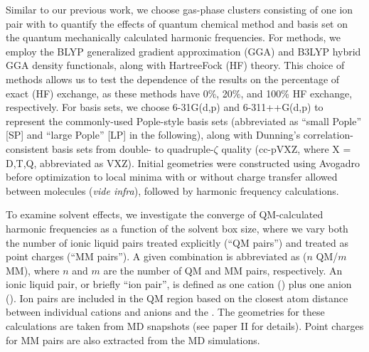 \documentclass[%
  class = book,%
  crop = false,%
  float = true,%
  multi = true,%
  preview = false,%
]{standalone}
\let\cite\autocite
\newcommand{\latin}[1]{\textit{#1}}
\begin{document}
Similar to our previous work\cite{Brinzer2015}, we choose gas-phase clusters consisting of one \ce{[C4C1im][PF6]} ion pair with  to quantify the effects of quantum chemical method and basis set on the quantum mechanically calculated harmonic frequencies. For methods, we employ the BLYP\cite{Becke1988,Lee1988} generalized gradient approximation (GGA) and B3LYP\cite{Becke1993,Stephens1994} hybrid GGA density functionals, along with Hartree\textendash{}Fock (HF) theory. This choice of methods allows us to test the dependence of the results on the percentage of exact (HF) exchange, as these methods have 0\%, 20\%, and 100\% HF exchange, respectively. For basis sets, we choose 6-31G(d,p)\cite{Hehre1972,Francl1982} and 6-311++G(d,p)\cite{Krishnan1980,McLean1980,Clark1983} to represent the commonly-used Pople-style basis sets (abbreviated as ``small Pople'' [SP] and ``large Pople'' [LP] in the following), along with Dunning's correlation-consistent basis sets from double- to quadruple-\(\zeta\) quality (cc-pVXZ, where X = D,T,Q, abbreviated as VXZ)\cite{Dunning1989,Dunning1993}. Initial geometries were constructed using Avogadro\cite{Hanwell2012,Avogadro} before optimization to local minima with or without charge transfer allowed between molecules (\latin{vide infra}), followed by harmonic frequency calculations.

To examine solvent effects, we investigate the converge of QM-calculated harmonic frequencies as a function of the solvent box size, where we vary both the number of ionic liquid pairs treated explicitly (``QM pairs'') and treated as point charges (``MM pairs''). A given combination is abbreviated as (\(n\) QM/\(m\) MM), where \(n\) and \(m\) are the number of QM and MM pairs, respectively. An ionic liquid pair, or briefly ``ion pair'', is defined as one cation (\ce{[C4C1im]+}) plus one anion (\ce{[PF6]-}). Ion pairs are included in the QM region based on the closest atom distance between individual cations and anions and the . The geometries for these calculations are taken from MD snapshots (see paper II\cite{Daly2016} for details). Point charges for MM pairs are also extracted from the MD simulations.
\end{document}
